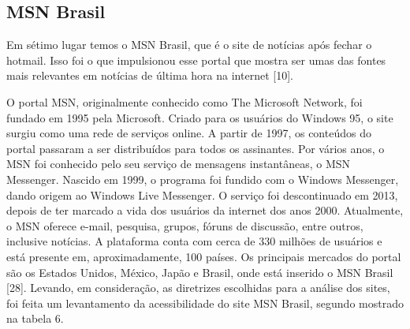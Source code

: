 \documentclass[a4paper]{article}
\begin{document}
\begin{titlepage}
\subsection{MSN Brasil}

Em sétimo lugar temos o MSN Brasil, que é o site de notícias após fechar o hotmail. Isso foi o que impulsionou esse portal que mostra ser umas das fontes mais relevantes em notícias de última hora na internet [10].

O portal MSN, originalmente conhecido como The Microsoft Network, foi fundado em 1995 pela Microsoft. Criado para os usuários do Windows 95, o site surgiu como uma rede de serviços online. A partir de 1997, os conteúdos do portal passaram a ser distribuídos para todos os assinantes. Por vários anos, o MSN foi conhecido pelo seu serviço de mensagens instantâneas, o MSN Messenger. Nascido em 1999, o programa foi fundido com o Windows Messenger, dando origem ao Windows Live Messenger. O serviço foi descontinuado em 2013, depois de ter marcado a vida dos usuários da internet dos anos 2000. Atualmente, o MSN oferece e-mail, pesquisa, grupos, fóruns de discussão, entre outros, inclusive notícias. A plataforma conta com cerca de 330 milhões de usuários e está presente em, aproximadamente, 100 países. Os principais mercados do portal são os Estados Unidos, México, Japão e  Brasil, onde está inserido o MSN Brasil [28].  Levando, em consideração, as diretrizes escolhidas para a análise dos sites, foi feita um levantamento da acessibilidade do site MSN Brasil, segundo mostrado na tabela 6.\\


\end{titlepage}
\end{document}
